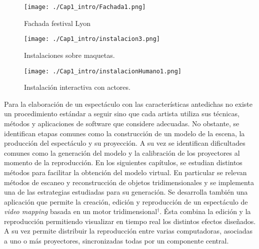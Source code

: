 \begin{figure}[H]
  \centering
    \texttt{[image: ./Cap1\_intro/Fachada1.png]}
  \caption[http://www.weltlighting.com/]{Fachada festival Lyon}
  \label{fig:Fachada1}
\end{figure}

\begin{figure}[H]
  \centering
    \texttt{[image: ./Cap1\_intro/instalacion3.png]}
  \caption[http://www.weltlighting.com/fragment]{Instalaciones sobre maquetas.}
  
  \label{fig:Instalacion}
\end{figure}

\begin{figure}[H]
  \centering
    \texttt{[image: ./Cap1\_intro/instalacionHumano1.png]}
  \caption[http://vimeo.com/2774865]{Instalación interactiva con actores.}
  \label{fig:Interactiva}
\end{figure}

Para la elaboración de un espectáculo con las características antedichas no existe un procedimiento estándar a seguir sino que cada artista utiliza sus técnicas, métodos y aplicaciones de software que considere adecuadas. No obstante, se identifican etapas comunes como la construcción de un modelo de la escena, la producción del espectáculo y su proyección. A su vez se identifican dificultades comunes como la generación del modelo y la calibración de los proyectores al momento de la reproducción.
En los siguientes capítulos, se estudian distintos métodos para facilitar la obtención del modelo virtual. En particular se relevan métodos de escaneo y reconstrucción de objetos tridimensionales y se implementa una de las estrategias estudiadas para su generación.
Se desarrolla también una aplicación que permite la creación, edición y reproducción de un espectáculo de \emph{video mapping} basada en un motor tridimensional$^\dagger$. Ésta combina la edición y la reproducción permitiendo visualizar en tiempo real los distintos efectos diseñados. A su vez permite distribuir la reproducción entre varias computadoras, asociadas a uno o más proyectores, sincronizadas todas por un componente central.

